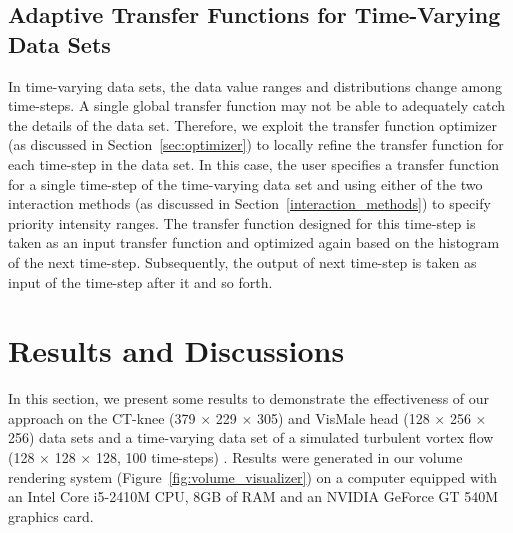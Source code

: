 
\subsection{Adaptive Transfer Functions for Time-Varying Data Sets \label{adative_transfer_functions_for_time-varying_data_sets}}
In time-varying data sets, the data value ranges and distributions change among time-steps. A single global transfer function may not be able to adequately catch the details of the data set.
Therefore, we exploit the transfer function optimizer (as discussed in Section~\ref{sec:optimizer}) to locally refine the transfer function for each time-step in the data set.
In this case, the user specifies a transfer function for a single time-step of the time-varying data set and using either of the two interaction methods (as discussed in Section~\ref{interaction_methods}) to specify priority intensity ranges.
The transfer function designed for this time-step is taken as an input transfer function and optimized again based on the histogram of the next time-step. Subsequently, the output of next time-step is taken as input of the time-step after it and so forth.

\section{Results and Discussions}
In this section, we present some results to demonstrate the effectiveness of our approach on the CT-knee (379 $ \times $ 229 $ \times $ 305) and VisMale head (128 $ \times $ 256 $ \times $ 256) data sets \cite{website:Roettger_volume_2013} and a time-varying data set of a simulated turbulent vortex flow (128 $\times$ 128 $\times$ 128, 100 time-steps) \cite{ma_high_2000}.
Results were generated in our volume rendering system (Figure~\ref{fig:volume_visualizer}) on a computer equipped with an Intel Core i5-2410M CPU, 8GB of RAM and an NVIDIA GeForce GT 540M graphics card.


